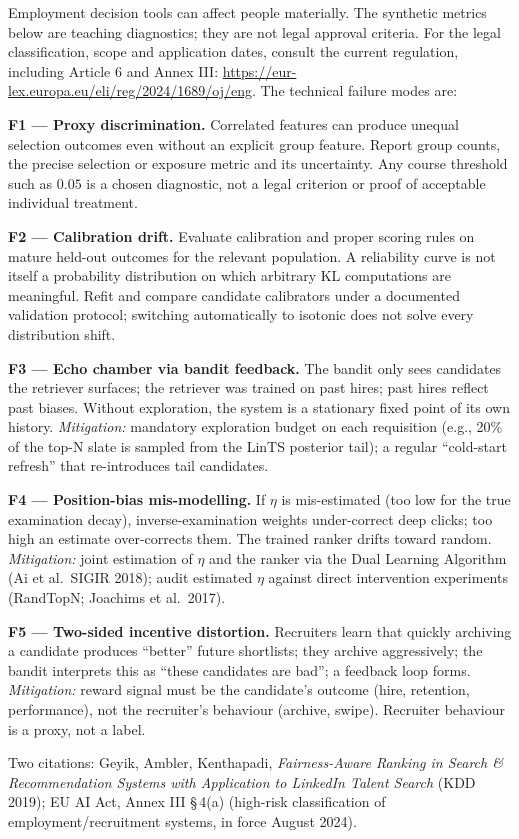 \documentclass[11pt,oneside]{scrbook}
\begin{document}
\begin{safetyangle}
Employment decision tools can affect people materially. The synthetic
metrics below are teaching diagnostics; they are not legal approval criteria.
For the legal classification, scope and application dates, consult the
current regulation, including Article 6 and Annex III:
\url{https://eur-lex.europa.eu/eli/reg/2024/1689/oj/eng}.
The technical failure modes are:

\textbf{F1 --- Proxy discrimination.} Correlated features can produce
unequal selection outcomes even without an explicit group feature.
Report group counts, the precise selection or exposure metric and its
uncertainty. Any course threshold such as $0.05$ is a chosen diagnostic,
not a legal criterion or proof of acceptable individual treatment.

\textbf{F2 --- Calibration drift.} Evaluate calibration and proper scoring
rules on mature held-out outcomes for the relevant population. A reliability
curve is not itself a probability distribution on which arbitrary KL
computations are meaningful. Refit and compare candidate calibrators under
a documented validation protocol; switching automatically to isotonic
does not solve every distribution shift.



\textbf{F3 --- Echo chamber via bandit feedback.} The bandit only sees
candidates the retriever surfaces; the retriever was trained on past
hires; past hires reflect past biases. Without exploration, the system
is a stationary fixed point of its own history. \emph{Mitigation:}
mandatory exploration budget on each requisition (e.g., 20\% of the
top-N slate is sampled from the LinTS posterior tail); a regular
``cold-start refresh'' that re-introduces tail candidates.

\textbf{F4 --- Position-bias mis-modelling.} If $\eta$ is mis-estimated
(too low for the true examination decay), inverse-examination weights
under-correct deep clicks; too high an estimate over-corrects them. The trained ranker drifts toward random. \emph{Mitigation:}
joint estimation of $\eta$ and the ranker via the Dual Learning Algorithm
(Ai et al.\ SIGIR 2018); audit estimated $\eta$ against direct
intervention experiments (RandTopN; Joachims et al.\ 2017).

\textbf{F5 --- Two-sided incentive distortion.} Recruiters learn that
quickly archiving a candidate produces ``better'' future shortlists; they
archive aggressively; the bandit interprets this as ``these candidates
are bad''; a feedback loop forms. \emph{Mitigation:} reward signal must be
the candidate's outcome (hire, retention, performance), not the
recruiter's behaviour (archive, swipe). Recruiter behaviour is a proxy,
not a label.

Two citations: Geyik, Ambler, Kenthapadi, \emph{Fairness-Aware Ranking in
Search \& Recommendation Systems with Application to LinkedIn Talent Search}
(KDD 2019); EU AI Act, Annex III \S\,4(a) (high-risk classification of
employment/recruitment systems, in force August 2024).
\end{safetyangle}
\end{document}
